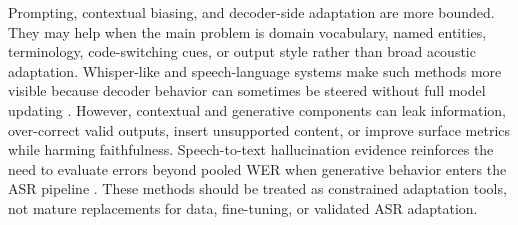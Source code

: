 \documentclass[pdflatex,sn-basic,iicol]{sn-jnl}
\theoremstyle{thmstyleone}
\theoremstyle{thmstyletwo}
\theoremstyle{thmstylethree}
\begin{document}
Prompting, contextual biasing, and decoder-side adaptation are more bounded. They may help when the main problem is domain vocabulary, named entities, terminology, code-switching cues, or output style rather than broad acoustic adaptation. Whisper-like and speech-language systems make such methods more visible because decoder behavior can sometimes be steered without full model updating \citep{pmlr-v202-radford23a,tian25b_interspeech}. However, contextual and generative components can leak information, over-correct valid outputs, insert unsupported content, or improve surface metrics while harming faithfulness. Speech-to-text hallucination evidence reinforces the need to evaluate errors beyond pooled WER when generative behavior enters the ASR pipeline \citep{koenecke2024carelesswhisper}. These methods should be treated as constrained adaptation tools, not mature replacements for data, fine-tuning, or validated ASR adaptation.
\end{document}
